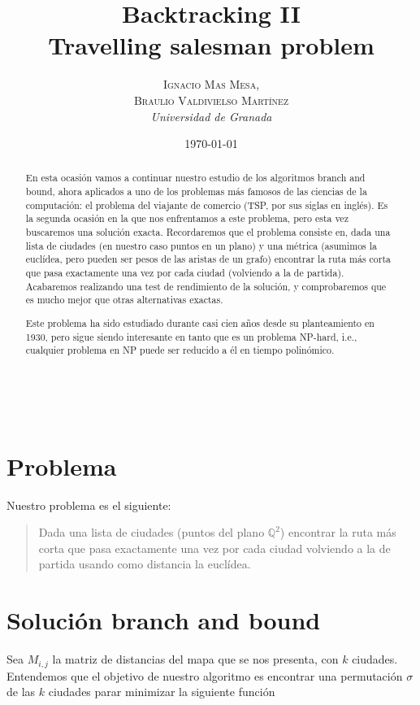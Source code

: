\documentclass[a4paper, 11pt]{article}
\title{\textbf{Backtracking II}\\ %
Travelling salesman problem} %
\author{\textsc{Ignacio Mas Mesa,\\Braulio Valdivielso Martínez} %
\\{\textit{Universidad de Granada}}} %
\date{\today} %
\makeatletter
\renewcommand{\maketitle}{
  \begin{flushright} %
  
  {\LARGE\@title} %
  
  \vspace{50pt} %
  
  {\large\@author} %
  \\\@date %
  \vspace{40pt} %
  \end{flushright}
}
\makeatother
\begin{document}
\maketitle %

\renewcommand{\abstractname}{Abstract} %
\begin{abstract}
En esta ocasión vamos a continuar nuestro estudio de los algoritmos branch and bound, ahora aplicados a uno de los problemas más famosos de las ciencias de la computación: el problema del viajante de comercio (TSP, por sus siglas en inglés). Es la segunda ocasión en la que nos enfrentamos a este problema, pero esta vez buscaremos una solución exacta. Recordaremos que el problema consiste en, dada una lista de ciudades (en nuestro caso puntos en un plano) y una métrica (asumimos la euclídea, pero pueden ser pesos de las aristas de un grafo) encontrar la ruta más corta que pasa exactamente una vez por cada ciudad (volviendo a la de partida). Acabaremos realizando una test de rendimiento de la solución, y comprobaremos que es mucho mejor que otras alternativas exactas.

Este problema ha sido estudiado durante casi cien años desde su planteamiento en 1930, pero sigue siendo interesante en tanto que es un problema NP-hard, i.e., cualquier problema en NP puede ser reducido a él en tiempo polinómico.
\end{abstract}

\vspace{30pt} %


  \tableofcontents

\pagebreak


\section{Problema}
Nuestro problema es el siguiente:
\begin{quote}
Dada una lista de ciudades (puntos del plano ${\mathbb Q}^2$) encontrar la ruta más corta que pasa exactamente una vez por cada ciudad volviendo a la de partida usando como distancia la euclídea.
\end{quote}

\section{Solución branch and bound}
Sea $M_{i,j}$ la matriz de distancias del mapa que se nos presenta, con $k$ ciudades. Entendemos que el objetivo de nuestro algoritmo es encontrar una permutación $\sigma$ de las $k$ ciudades parar minimizar la siguiente función
\end{document}
